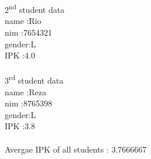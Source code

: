 \documentclass[12pt,titlepage]{article}
\begin{document}
\begin{enumerate}
    \mbox{}\\
    \mbox{}\\ 2\textsuperscript{nd} student data
    \mbox{}\\ name :Rio
    \mbox{}\\ nim :7654321
    \mbox{}\\ gender:L
    \mbox{}\\ IPK :4.0
    \mbox{}\\
    \mbox{}\\ 3\textsuperscript{rd} student data
    \mbox{}\\ name :Reza
    \mbox{}\\ nim :8765398
    \mbox{}\\ gender:L
    \mbox{}\\ IPK :3.8
    \mbox{}\\ 
    \mbox{}\\ Avergae IPK of all students : 3.7666667
    \mbox{}\\ 
\end{enumerate}
\end{document}
